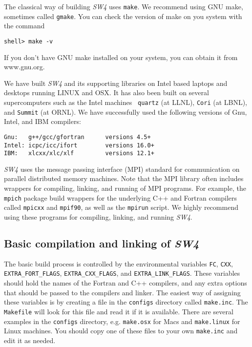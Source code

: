 \documentclass[11pt]{article}
\begin{document}
The classical way of building \emph{SW4} uses \verb+make+. We recommend using GNU make, sometimes called \verb+gmake+. You can check the version of make on you system with the command
\begin{verbatim}
shell> make -v
\end{verbatim}
If you don't have GNU make installed on your system, you can obtain it from www.gnu.org.

We have built \emph{SW4} and its supporting libraries on Intel based laptops and desktops running
LINUX and OSX. It has also been built on several supercomputers such as the Intel machines {\tt 
quartz} (at LLNL), {\tt Cori} (at LBNL), and {\tt Summit} (at ORNL). We have
successfully used the following versions of Gnu, Intel, and IBM compilers:
\begin{verbatim}
Gnu:   g++/gcc/gfortran      versions 4.5+
Intel: icpc/icc/ifort        versions 16.0+
IBM:   xlcxx/xlc/xlf         versions 12.1+
\end{verbatim}

\emph{SW4} uses the message passing interface (MPI) standard for communication on parallel distributed memory machines. Note that the MPI library often includes wrappers for compiling, linking, and running of MPI programs. For example, the {\tt mpich} package build wrappers for the underlying C++ and Fortran compilers called {\tt mpicxx} and {\tt mpif90}, as well as the {\tt mpirun} script. We highly recommend using these programs for compiling, linking, and running \emph{SW4}.


\subsection{Basic compilation and linking of \emph{SW4}}\label{sec:basic-install}

The basic build process is controlled by the environmental variables \verb+FC+, \verb+CXX+, \verb+EXTRA_FORT_FLAGS+, \verb+EXTRA_CXX_FLAGS+, and \verb+EXTRA_LINK_FLAGS+. These variables should hold the names of the Fortran and C++ compilers, and any extra options that should be passed to the compilers and linker. The easiest way of assigning these variables is by creating a file in the \verb+configs+ directory called \verb+make.inc+. The \verb+Makefile+ will look for this file and read it if it is available. There are several examples in the \verb+configs+ directory, e.g. \verb+make.osx+ for Macs and \verb+make.linux+ for Linux machines. You should copy one of these files to your own \verb+make.inc+ and edit it as needed. 
\end{document}
